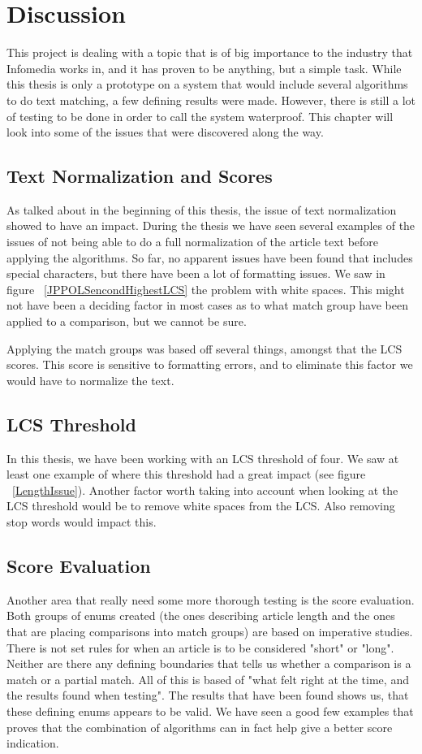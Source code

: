 \chapter{Discussion}

This project is dealing with a topic that is of big importance to the industry that Infomedia works in, and it has proven to be anything, but a simple task. While this thesis is only a prototype on a system that would include several algorithms to do text matching, a few defining results were made. However, there is still a lot of testing to be done in order to call the system waterproof. This chapter will look into some of the issues that were discovered along the way.

\section{Text Normalization and Scores}
As talked about in the beginning of this thesis, the issue of text normalization showed to have an impact. During the thesis we have seen several examples of the issues of not being able to do a full normalization of the article text before applying the algorithms. So far, no apparent issues have been found that includes special characters, but there have been a lot of formatting issues. We saw in figure ~\ref{JPPOLSencondHighestLCS} the problem with white spaces. This might not have been a deciding factor in most cases as to what match group have been applied to a comparison, but we cannot be sure.

Applying the match groups was based off several things, amongst that the LCS scores. This score is sensitive to formatting errors, and to eliminate this factor we would have to normalize the text.

\section{LCS Threshold}
In this thesis, we have been working with an LCS threshold of four. We saw at least one example of where this threshold had a great impact (see figure ~\ref{LengthIssue}). Another factor worth taking into account when looking at the LCS threshold would be to remove white spaces from the LCS. Also removing stop words would impact this.

\section{Score Evaluation}
Another area that really need some more thorough testing is the score evaluation. Both groups of enums created (the ones describing article length and the ones that are placing comparisons into match groups) are based on imperative studies. There is not set rules for when an article is to be considered "short" or "long". Neither are there any defining boundaries that tells us whether a comparison is a match or a partial match. All of this is based of "what felt right at the time, and the results found when testing". The results that have been found shows us, that these defining enums appears to be valid. We have seen a good few examples that proves that the combination of algorithms can in fact help give a better score indication. 

